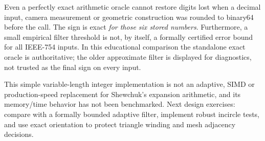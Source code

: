 \begin{booktwopitfall}
Even a perfectly exact arithmetic oracle cannot restore digits
lost when a decimal input, camera measurement or geometric
construction was rounded to binary64 before the call.
The sign is exact \emph{for those six stored numbers}.
Furthermore, a small empirical filter threshold is not,
by itself, a formally certified error bound for all
IEEE-754 inputs. In this educational comparison the
standalone exact oracle is authoritative; the older
approximate filter is displayed for diagnostics, not
trusted as the final sign on every input.

This simple variable-length integer implementation is
not an adaptive, SIMD or production-speed replacement
for Shewchuk's expansion arithmetic, and its memory/time
behavior has not been benchmarked. Next design exercises:
compare with a formally bounded adaptive filter,
implement robust incircle tests, and use exact orientation
to protect triangle winding and mesh adjacency decisions.
\end{booktwopitfall}
